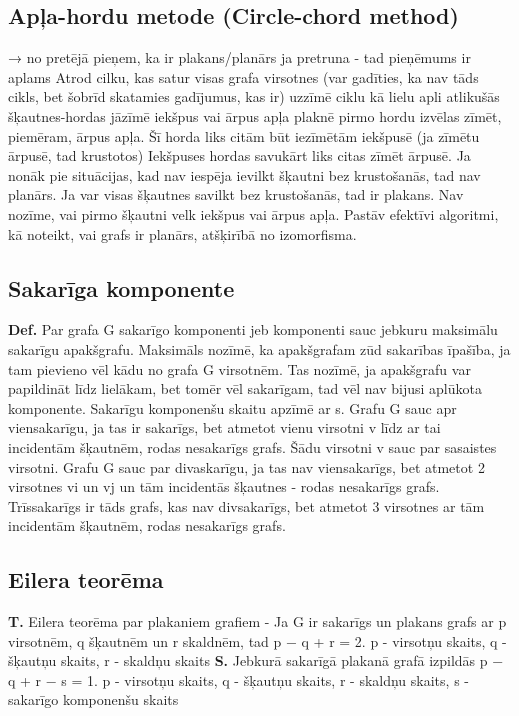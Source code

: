\documentclass{article}
\begin{document}
\subsection{Apļa-hordu metode (Circle-chord method)}
→ no pretējā
pieņem, ka ir plakans/planārs
ja pretruna - tad pieņēmums ir aplams
Atrod cilku, kas satur visas grafa virsotnes (var gadīties, ka nav tāds cikls, bet šobrīd skatamies gadījumus, kas ir) uzzīmē ciklu kā lielu apli atlikušās šķautnes-hordas jāzīmē iekšpus vai ārpus apļa plaknē pirmo hordu izvēlas zīmēt, piemēram, ārpus apļa.
Šī horda liks citām būt iezīmētām iekšpusē (ja zīmētu ārpusē, tad krustotos) Iekšpuses hordas savukārt liks citas zīmēt ārpusē.  Ja nonāk pie situācijas, kad nav iespēja ievilkt šķautni bez krustošanās, tad nav planārs.
Ja var visas šķautnes savilkt bez krustošanās, tad ir plakans.  Nav nozīme, vai pirmo šķautni velk iekšpus vai ārpus apļa.  Pastāv efektīvi algoritmi, kā noteikt, vai grafs ir planārs, atšķirībā no izomorfisma.

\subsection{Sakarīga komponente}
\textbf{Def.}  Par grafa G sakarīgo komponenti jeb komponenti sauc jebkuru maksimālu sakarīgu apakšgrafu.
Maksimāls nozīmē, ka apakšgrafam zūd sakarības īpašība, ja tam pievieno vēl kādu no grafa G virsotnēm. Tas nozīmē, ja apakšgrafu var papildināt līdz lielākam, bet tomēr vēl sakarīgam, tad vēl nav bijusi aplūkota komponente.  Sakarīgu komponenšu skaitu apzīmē ar s.  Grafu G sauc apr viensakarīgu, ja tas ir sakarīgs, bet atmetot vienu virsotni v līdz ar tai incidentām šķautnēm, rodas nesakarīgs grafs. Šādu virsotni v sauc par sasaistes virsotni.
Grafu G sauc par divaskarīgu, ja tas nav viensakarīgs, bet atmetot 2 virsotnes vi un vj un tām incidentās šķautnes - rodas nesakarīgs grafs. Trīssakarīgs ir tāds grafs, kas nav divsakarīgs, bet atmetot 3 virsotnes ar tām incidentām šķautnēm, rodas nesakarīgs grafs.

\subsection{Eilera teorēma}

\textbf{T.} Eilera teorēma par plakaniem grafiem - Ja G ir sakarīgs un plakans grafs ar p virsotnēm, q šķautnēm un r skaldnēm, tad p − q + r = 2.
p - virsotņu skaits, q - šķautņu skaits, r - skaldņu skaits
\textbf{S. } Jebkurā sakarīgā plakanā grafā izpildās p − q + r − s = 1.  p - virsotņu skaits, q - šķautņu skaits, r - skaldņu skaits, s - sakarīgo komponenšu skaits
\end{document}
